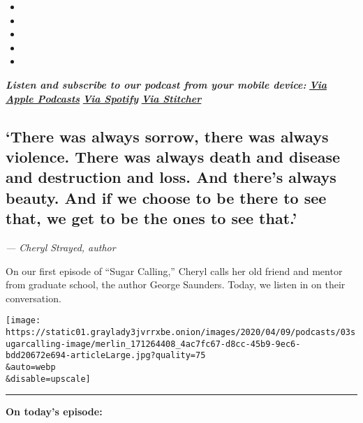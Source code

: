 \begin{itemize}
\item
\item
\item
\item
\item
\end{itemize}

\emph{\textbf{Listen and subscribe to our podcast from your mobile
device:}}
\textbf{\href{https://podcasts.apple.com/us/podcast/sugar-calling/id1505881384}{\emph{Via
Apple Podcasts}}} \emph{\textbf{\textbar{}}}
\textbf{\href{https://open.spotify.com/show/4U8hPiNGIBvTS9zLeiDCN7?si=gRyigD47SPWl-QWgNjgt2w}{\emph{Via
Spotify}}} \emph{\textbf{\textbar{}}}
\textbf{\href{https://www.stitcher.com/podcast/the-new-york-times/sugar-calling}{\emph{Via
Stitcher}}}

\hypertarget{there-was-always-sorrow-there-was-always-violence-there-was-always-death-and-disease-and-destruction-and-loss-and-theres-always-beauty-and-if-we-choose-to-be-there-to-see-that-we-get-to-be-the-ones-to-see-that}{%
\subsection{`There was always sorrow, there was always violence. There
was always death and disease and destruction and loss. And there's
always beauty. And if we choose to be there to see that, we get to be
the ones to see
that.'}\label{there-was-always-sorrow-there-was-always-violence-there-was-always-death-and-disease-and-destruction-and-loss-and-theres-always-beauty-and-if-we-choose-to-be-there-to-see-that-we-get-to-be-the-ones-to-see-that}}

\emph{--- Cheryl Strayed, author}

On our first episode of ``Sugar Calling,'' Cheryl calls her old friend
and mentor from graduate school, the author George Saunders. Today, we
listen in on their conversation.

\texttt{[image: https://static01.graylady3jvrrxbe.onion/images/2020/04/09/podcasts/03sugarcalling-image/merlin\_171264408\_4ac7fc67-d8cc-45b9-9ec6-bdd20672e694-articleLarge.jpg?quality=75\\\&auto=webp\\\&disable=upscale]}

\begin{center}\rule{0.5\linewidth}{\linethickness}\end{center}

\textbf{On today's episode:}

